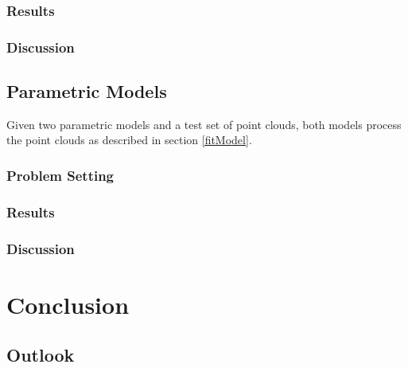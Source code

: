 \subsection{Results}
\subsection{Discussion}

\section{Parametric Models}
Given two parametric models and a test set of point clouds, both models process the point clouds as described in section \ref{fitModel}.
\subsection{Problem Setting}
\subsection{Results}
\subsection{Discussion}

\chapter{Conclusion}

\section{Outlook}
